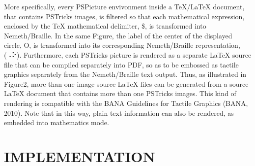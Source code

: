 \documentclass[11.5pt]{sig-alternate} %
\begin{document}
\begin{large}
More specifically, every PSPicture envivonment inside a TeX/LaTeX document, that contains PSTricks images, is filtered so that each mathematical expression, enclosed by the TeX mathematical delimiter, \$, is transformed into Neme\-th/Braille. In the same Figure, the label of the center of the displayed circle, O, is transformed into its corresponding Nemeth/Braille representation, (⠠⠕). Furthermore, each PSTricks picture is rendered as a separate LaTeX source file that can be compiled separately into PDF, so as to be embossed as tactile graphics separately from the Nemeth/Braille text output. Thus, as illustrated in Figure2, more than one image source LaTeX files can be generated from a source LaTeX document that contains more than one PSTricks images. This kind of rendering is compatible with the BANA Guidelines for Tactile Graphics (BANA, 2010). Note that in this way, plain text information can also be rendered, as embedded into mathematics mode.

\section*{IMPLEMENTATION}


\end{large}
\end{document}
